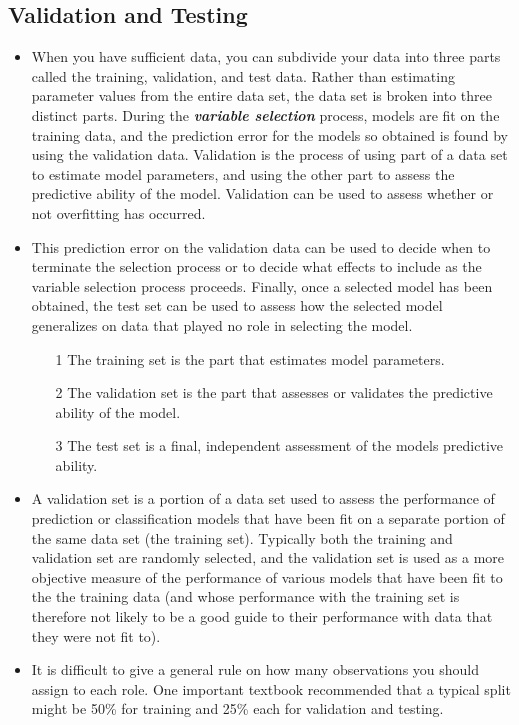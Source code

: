 \documentclass[a4paper,12pt]{article}
\begin{document}
\subsection{Validation and Testing}
\begin{itemize}
	\item When you have sufficient data, you can subdivide your data into three parts called the training, validation, and test data. Rather than estimating parameter values from the entire data set, the data set is broken into three distinct parts. During the \textbf{\textit{variable selection}} process, models are fit on the training data, and the prediction error for the models so obtained is found by using the validation data. Validation is the process of using part of a data set to estimate model parameters, and using the other part to assess the predictive ability of the model. Validation can be used to assess whether or not overfitting has occurred.
	
\item 	This prediction error on the validation data can be used to decide when to terminate the selection process or to decide what effects to include as the variable selection process proceeds. Finally, once a selected model has been obtained, the test set can be used to assess how the selected model generalizes on data that played no role in selecting the model.
	
	\begin{itemize}
		\item[1] The training set is the part that estimates model parameters.
		\item[2] The validation set is the part that assesses or validates the predictive ability of the model.
		\item[3] The test set is a final, independent assessment of the models predictive ability.
	\end{itemize}
	
\item	A validation set is a portion of a data set used to assess the performance of prediction or classification models that have been fit on a separate portion of the same data set (the training set). Typically both the training and validation set are randomly selected, and the validation set is used as a more objective measure of the performance of various models that have been fit to the the training data (and whose performance with the training set is therefore not
	likely to be a good guide to their performance with data that they were not fit to).
	
\item 	It is difficult to give a general rule on how many observations you should assign to each role. One important textbook recommended that a typical split might be 50\% for training and 25\% each for validation and testing.
	
	
	
\end{itemize}
\end{document}

